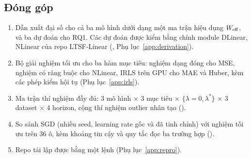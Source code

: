 \subsection{Đóng góp}

\begin{enumerate}
    \item Dẫn xuất đại số cho cả ba mô hình dưới dạng một ma trận hiệu dụng $W_{\mathrm{eff}}$, và ba dự đoán cho RQ1. Các dự đoán được kiểm bằng chính module DLinear, NLinear của repo LTSF-Linear (, Phụ lục~\ref{app:derivation}).
    \item Bộ giải nghiệm tối ưu cho ba hàm mục tiêu: nghiệm dạng đóng cho MSE, nghiệm có ràng buộc cho NLinear, IRLS trên GPU cho MAE và Huber, kèm các phép kiểm hội tụ (Phụ lục~\ref{app:irls}).
    \item Ma trận thí nghiệm đầy đủ: 3 mô hình $\times$ 3 mục tiêu $\times$ $\{\lambda = 0, \lambda^*\}$ $\times$ 3 dataset $\times$ 4 horizon, cộng thí nghiệm outlier nhân tạo ().
    \item So sánh SGD (nhiều seed, learning rate gốc và đã tinh chỉnh) với nghiệm tối ưu trên 36 ô, kèm khoảng tin cậy và quy tắc đọc ba trường hợp ().
    \item Repo tái lập được bằng một lệnh (Phụ lục~\ref{app:repro}).
\end{enumerate}
